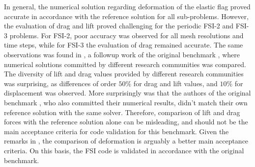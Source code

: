In general, the numerical solution regarding deformation of the elastic flag proved accurate in accordance with the reference solution for all sub-problems. However, the evaluation of drag and lift proved challenging for the periodic FSI-2 and FSI-3 problems. For FSI-2, poor accuracy was observed for all mesh resolutions and time steps, while for FSI-3 the evaluation of drag remained accurate. The same observations was found in \cite{Turek}, a followup work of the original benchmark \cite{Hron2006}, where numerical solutions committed by different research communities was compared. The diversity of lift and drag values provided by different research communities was surprising, as differences of order $50\%$ for drag and lift values, and $10\%$ for displacement was observed. More surprisingly was that the authors of the original benchmark \cite{Hron2006}, who also committed their numerical results, didn't match their own reference solution with the same solver. Therefore,  comparison of lift and drag forces with the reference solution alone can be misleading, and should not be the main acceptance criteria for code validation for this benchmark. Given the remarks in \cite{Turek}, the comparison of deformation is arguably a better main acceptance criteria. On this basis, the FSI code is validated in accordance with the original benchmark.  \\
 
